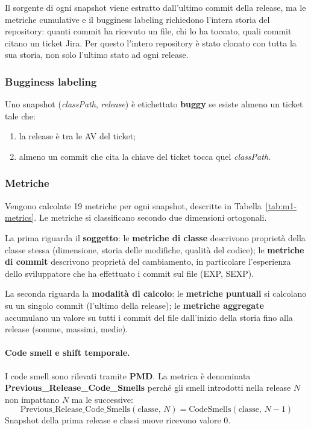 Il sorgente di ogni snapshot viene estratto dall'ultimo commit della release, ma le metriche
cumulative e il bugginess labeling richiedono l'intera storia del repository: quanti commit
ha ricevuto un file, chi lo ha toccato, quali commit citano un ticket Jira. Per questo
l'intero repository è stato clonato con tutta la sua storia, non solo l'ultimo stato ad ogni release.

\subsubsection{Bugginess labeling}

Uno snapshot (\emph{classPath}, \emph{release}) è etichettato \textbf{buggy} se esiste
almeno un ticket tale che:
\begin{enumerate}
    \item la release è tra le AV del ticket;
    \item almeno un commit che cita la chiave del ticket tocca quel \emph{classPath}.
\end{enumerate}


\subsubsection{Metriche}

Vengono calcolate 19 metriche per ogni snapshot, descritte in Tabella~\ref{tab:m1-metrics}.
Le metriche si classificano secondo due dimensioni ortogonali.

La prima riguarda il \textbf{soggetto}: le \textbf{metriche di classe} descrivono proprietà
della classe stessa (dimensione, storia delle modifiche, qualità del codice); le
\textbf{metriche di commit} descrivono proprietà del cambiamento, in particolare
l'esperienza dello sviluppatore che ha effettuato i commit sul file (EXP, SEXP).

La seconda riguarda la \textbf{modalità di calcolo}: le \textbf{metriche puntuali}
si calcolano su un singolo commit (l'ultimo della release); le \textbf{metriche aggregate}
accumulano un valore su tutti i commit del file dall'inizio della storia fino alla release
(somme, massimi, medie).

\paragraph{Code smell e shift temporale.}
I code smell sono rilevati tramite \textbf{PMD}. La metrica è denominata
\textbf{Previous\_Release\_Code\_Smells} perché gli smell introdotti nella release $N$ non
impattano $N$ ma le successive:
\[
\text{Previous\_Release\_Code\_Smells}(\text{classe},\, N) = \text{CodeSmells}(\text{classe},\, N-1)
\]
Snapshot della prima release e classi nuove ricevono valore 0.
